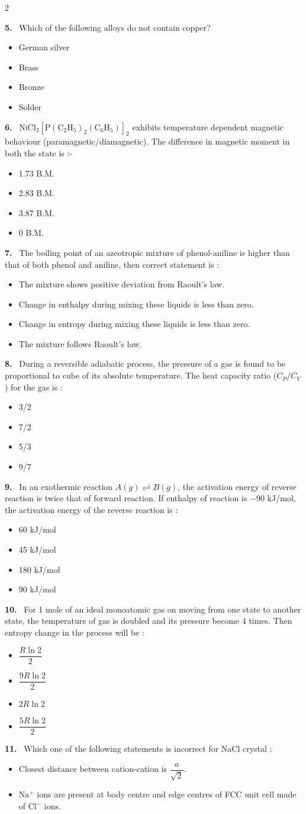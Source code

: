 \documentclass[10pt]{extarticle}
\newcommand{\qn}[1]{\par\smallskip\noindent\textbf{#1.}~}
\newenvironment{qoptions}{\begin{itemize}[leftmargin=1.8em,itemsep=1pt,topsep=2pt,label={}]}{\end{itemize}}
\newcommand{\opt}[2]{\item[(#1)] #2}
\begin{document}
\begin{multicols}{2}
\qn{5} Which of the following alloys do not contain copper?
\begin{qoptions}
\opt{A}{German silver}
\opt{B}{Brass}
\opt{C}{Bronze}
\opt{D}{Solder}
\end{qoptions}
\qn{6} $\mathrm{NiCl_2[P(C_2H_5)_2(C_6H_5)]_2}$ exhibits temperature dependent magnetic behaviour (paramagnetic/diamagnetic). The difference in magnetic moment in both the state is :-
\begin{qoptions}
\opt{A}{1.73 B.M.}
\opt{B}{2.83 B.M.}
\opt{C}{3.87 B.M.}
\opt{D}{0 B.M.}
\end{qoptions}
\qn{7} The boiling point of an azeotropic mixture of phenol-aniline is higher than that of both phenol and aniline, then correct statement is :
\begin{qoptions}
\opt{A}{The mixture shows positive deviation from Raoult's law.}
\opt{B}{Change in enthalpy during mixing these liquids is less than zero.}
\opt{C}{Change in entropy during mixing these liquids is less than zero.}
\opt{D}{The mixture follows Raoult's law.}
\end{qoptions}
\qn{8} During a reversible adiabatic process, the pressure of a gas is found to be proportional to cube of its absolute temperature. The heat capacity ratio ($C_P/C_V$) for the gas is :
\begin{qoptions}
\opt{A}{3/2}
\opt{B}{7/2}
\opt{C}{5/3}
\opt{D}{9/7}
\end{qoptions}
\qn{9} In an exothermic reaction $A(g)\rightleftharpoons B(g)$, the activation energy of reverse reaction is twice that of forward reaction. If enthalpy of reaction is $-90$ kJ/mol, the activation energy of the reverse reaction is :
\begin{qoptions}
\opt{A}{60 kJ/mol}
\opt{B}{45 kJ/mol}
\opt{C}{180 kJ/mol}
\opt{D}{90 kJ/mol}
\end{qoptions}
\qn{10} For 1 mole of an ideal monoatomic gas on moving from one state to another state, the temperature of gas is doubled and its pressure become 4 times. Then entropy change in the process will be :
\begin{qoptions}
\opt{A}{$\dfrac{R\ln2}{2}$}
\opt{B}{$\dfrac{9R\ln2}{2}$}
\opt{C}{$2R\ln2$}
\opt{D}{$\dfrac{5R\ln2}{2}$}
\end{qoptions}
\qn{11} Which one of the following statements is incorrect for NaCl crystal :\par
[$a$ = Edge length of unit cell]
\begin{qoptions}
\opt{A}{Closest distance between cation-cation is $\dfrac a{\sqrt2}$.}
\opt{B}{$\mathrm{Na^+}$ ions are present at body centre and edge centres of FCC unit cell made of $\mathrm{Cl^-}$ ions.}

\end{qoptions}
\end{multicols}
\end{document}
